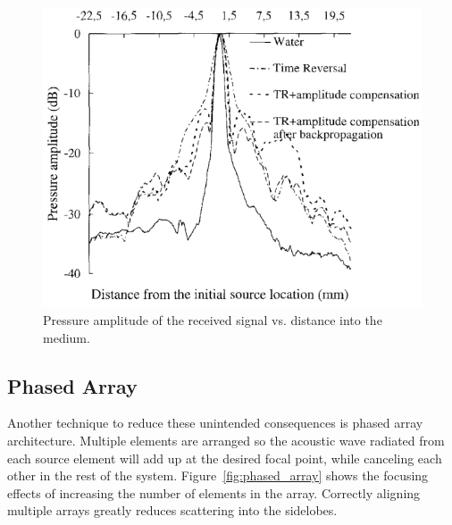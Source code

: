 \documentclass[letter,12pt,titlepage]{article}
\begin{document}
				\begin{figure}[h!]
					\centering
					\includegraphics[width=.75\textwidth]{./PNGs/Time_Reversal.png}
					\caption{Pressure amplitude of the received signal vs. distance into the medium. \cite{Thomas_1996}}
					\label{fig:time_reversal}
				\end{figure}
	
	\subsection{Phased Array}
	
		Another technique to reduce these unintended consequences is phased array architecture. Multiple elements are arranged so the acoustic wave radiated from each source element will add up at the desired focal point, while canceling each other in the rest of the system. Figure~\ref{fig:phased_array} shows the focusing effects of increasing the number of elements in the array. Correctly aligning multiple arrays greatly reduces scattering into the sidelobes.\cite{Sun_1998}
		
\end{document}
